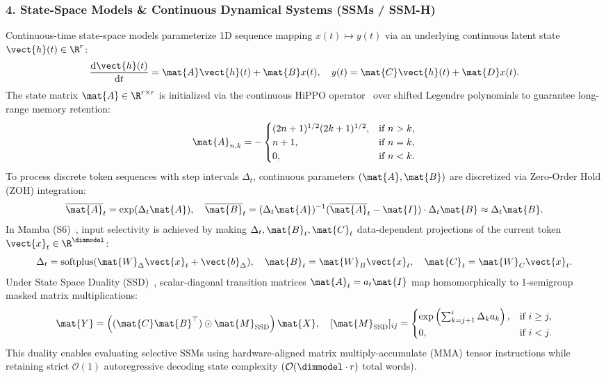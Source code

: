 \subsubsection{4. State-Space Models \& Continuous Dynamical Systems (SSMs / SSM-H)}
\label{subsubsec:ssm_contract}
Continuous-time state-space models parameterize 1D sequence mapping $x(t) \mapsto y(t)$ via an underlying continuous latent state $\vect{h}(t) \in \R^r$:
\begin{equation}
\frac{\mathrm{d}\vect{h}(t)}{\mathrm{d}t} = \mat{A} \vect{h}(t) + \mat{B} x(t), \quad y(t) = \mat{C} \vect{h}(t) + \mat{D} x(t).
\label{eq:continuous_ssm_ode}
\end{equation}
The state matrix $\mat{A} \in \R^{r \times r}$ is initialized via the continuous HiPPO operator~\cite{gu2020hippo} over shifted Legendre polynomials to guarantee long-range memory retention:
\begin{equation}
\mat{A}_{n, k} = -\begin{cases} (2n + 1)^{1/2}(2k + 1)^{1/2}, & \text{if } n > k, \\ n + 1, & \text{if } n = k, \\ 0, & \text{if } n < k. \end{cases}
\end{equation}
To process discrete token sequences with step intervals $\Delta_t$, continuous parameters $(\mat{A}, \mat{B})$ are discretized via Zero-Order Hold (ZOH) integration:
\begin{equation}
\overline{\mat{A}}_t = \exp(\Delta_t \mat{A}), \quad \overline{\mat{B}}_t = (\Delta_t \mat{A})^{-1} (\overline{\mat{A}}_t - \mat{I}) \cdot \Delta_t \mat{B} \approx \Delta_t \mat{B}.
\label{eq:zoh_discretization}
\end{equation}
In Mamba (S6)~\cite{gu2022mamba}, input selectivity is achieved by making $\Delta_t, \mat{B}_t, \mat{C}_t$ data-dependent projections of the current token $\vect{x}_t \in \R^{\dimmodel}$:
\begin{equation}
\Delta_t = \operatorname{softplus}(\mat{W}_\Delta \vect{x}_t + \vect{b}_\Delta), \quad \mat{B}_t = \mat{W}_B \vect{x}_t, \quad \mat{C}_t = \mat{W}_C \vect{x}_t.
\end{equation}
Under State Space Duality (SSD)~\cite{dao2024mamba2}, scalar-diagonal transition matrices $\mat{A}_t = a_t \mat{I}$ map homomorphically to 1-semigroup masked matrix multiplications:
\begin{equation}
\mat{Y} = \left( (\mat{C} \mat{B}^\top) \odot \mat{M}_{\text{SSD}} \right) \mat{X}, \quad [\mat{M}_{\text{SSD}}]_{ij} = \begin{cases} \exp\left( \sum_{k=j+1}^i \Delta_k a_k \right), & \text{if } i \ge j, \\ 0, & \text{if } i < j. \end{cases}
\end{equation}
This duality enables evaluating selective SSMs using hardware-aligned matrix multiply-accumulate (MMA) tensor instructions while retaining strict $\mathcal{O}(1)$ autoregressive decoding state complexity ($\mathcal{O}(\dimmodel \cdot r)$ total words).

